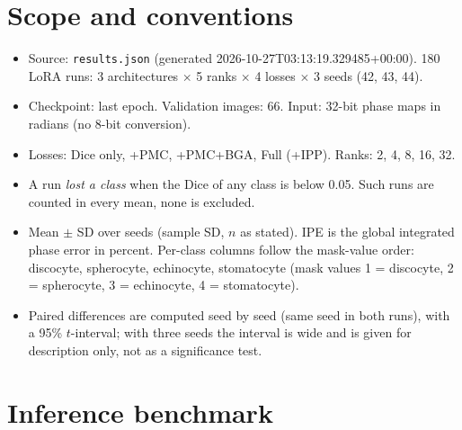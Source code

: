 \documentclass[10pt]{article}
\begin{document}
\clearpage\appendix\begin{landscape}

\section*{Scope and conventions}
\begin{itemize}\itemsep0pt
\item Source: \texttt{results.json} (generated 2026-10-27T03:13:19.329485+00:00). 180 LoRA runs: 3 architectures $\times$ 5 ranks $\times$ 4 losses $\times$ 3 seeds (42, 43, 44).
\item Checkpoint: last epoch. Validation images: 66. Input: 32-bit phase maps in radians (no 8-bit conversion).
\item Losses: Dice only, +PMC, +PMC+BGA, Full (+IPP). Ranks: 2, 4, 8, 16, 32.
\item A run \emph{lost a class} when the Dice of any class is below 0.05. Such runs are counted in every mean, none is excluded.
\item Mean $\pm$ SD over seeds (sample SD, $n$ as stated). IPE is the global integrated phase error in percent. Per-class columns follow the mask-value order: discocyte, spherocyte, echinocyte, stomatocyte (mask values 1 = discocyte, 2 = spherocyte, 3 = echinocyte, 4 = stomatocyte).
\item Paired differences are computed seed by seed (same seed in both runs), with a 95\% $t$-interval; with three seeds the interval is wide and is given for description only, not as a significance test.
\end{itemize}

\section{Inference benchmark}


\end{landscape}
\end{document}
